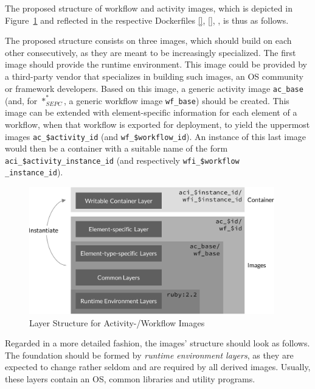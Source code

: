   The proposed structure of workflow and activity images, which is depicted in Figure~\ref{fig:layers_for_element_wrapping_containers} and reflected in the respective Dockerfiles \ref{}, \ref{}, , is thus as follows.

  The proposed structure consists on three images, which should build on each other consecutively, as they are meant to be increasingly specialized. The first image should provide the runtime environment. This image could be provided by a third-party vendor that specializes in building such images, \ie an \ac{OS} community or framework developers. Based on this image, a generic activity image \texttt{ac\_base} (and, for $*_{SEPC}^{*}$, a generic workflow image \texttt{wf\_base}) should be created. This image can be extended with element-specific information for each element of a workflow, when that workflow is exported for deployment, to yield the uppermost images \texttt{ac\_\$activity\_id} (and \texttt{wf\_\$workflow\_id}). An instance of this last image would then be a container with a suitable name of the form \texttt{aci\_\$activity\_instance\_id} (and respectively \texttt{wfi\_\$workflow\\\_instance\_id}).

  \begin{figure}[htbp]
    \centering
    \includegraphics[width=0.95\textwidth]{content/images/layer_concept-crop.pdf}
    \caption{Layer Structure for Activity-/Workflow Images}
    \label{fig:layers_for_element_wrapping_containers}
  \end{figure}

  Regarded in a more detailed fashion, the images' structure should look as follows.
  The foundation should be formed by \emph{runtime environment layers}, as they are expected to change rather seldom and are required by all derived images. Usually, these layers contain an \ac{OS}, common libraries and utility programs.

